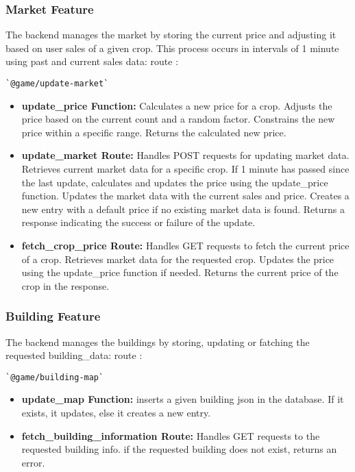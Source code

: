 \documentclass[12pt]{article}
\begin{document}
\subsubsection{Market Feature}
The backend manages the market by storing the current price and adjusting it based on user sales of a given crop. This process occurs in intervals of 1 minute using past and current sales data:
route : \begin{verbatim}`@game/update-market`\end{verbatim}
\begin{itemize}
    \item \textbf{update\_price Function:} Calculates a new price for a crop. Adjusts the price based on the current count and a random factor. Constrains the new price within a specific range. Returns the calculated new price.
    \item \textbf{update\_market Route:} Handles POST requests for updating market data. Retrieves current market data for a specific crop. If 1 minute has passed since the last update, calculates and updates the price using the update\_price function. Updates the market data with the current sales and price. Creates a new entry with a default price if no existing market data is found. Returns a response indicating the success or failure of the update.
    \item \textbf{fetch\_crop\_price Route:} Handles GET requests to fetch the current price of a crop. Retrieves market data for the requested crop. Updates the price using the update\_price function if needed. Returns the current price of the crop in the response.
\end{itemize}

\subsubsection{Building Feature}
The backend manages the buildings by storing, updating or fatching the requested building\_data:
route : \begin{verbatim}`@game/building-map`\end{verbatim}
\begin{itemize}
    \item \textbf{update\_map Function:} inserts a given building json in the database. If it exists, it updates, else it creates a new entry.
    \item \textbf{fetch\_building\_information Route:} Handles GET requests to the requested building info. if the requested building does not exist, returns an error.
\end{itemize}
\end{document}
